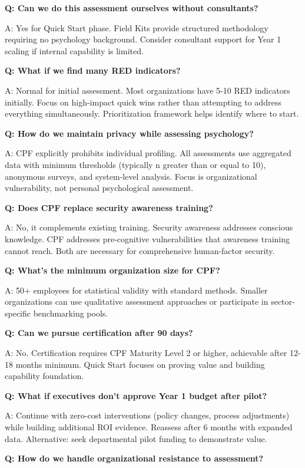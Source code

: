\documentclass[11pt,a4paper]{article}
\begin{document}
\textbf{Q: Can we do this assessment ourselves without consultants?}

A: Yes for Quick Start phase. Field Kits provide structured methodology requiring no psychology background. Consider consultant support for Year 1 scaling if internal capability is limited.

\textbf{Q: What if we find many RED indicators?}

A: Normal for initial assessment. Most organizations have 5-10 RED indicators initially. Focus on high-impact quick wins rather than attempting to address everything simultaneously. Prioritization framework helps identify where to start.

\textbf{Q: How do we maintain privacy while assessing psychology?}

A: CPF explicitly prohibits individual profiling. All assessments use aggregated data with minimum thresholds (typically n greater than or equal to 10), anonymous surveys, and system-level analysis. Focus is organizational vulnerability, not personal psychological assessment.

\textbf{Q: Does CPF replace security awareness training?}

A: No, it complements existing training. Security awareness addresses conscious knowledge. CPF addresses pre-cognitive vulnerabilities that awareness training cannot reach. Both are necessary for comprehensive human-factor security.

\textbf{Q: What's the minimum organization size for CPF?}

A: 50+ employees for statistical validity with standard methods. Smaller organizations can use qualitative assessment approaches or participate in sector-specific benchmarking pools.

\textbf{Q: Can we pursue certification after 90 days?}

A: No. Certification requires CPF Maturity Level 2 or higher, achievable after 12-18 months minimum. Quick Start focuses on proving value and building capability foundation.

\textbf{Q: What if executives don't approve Year 1 budget after pilot?}

A: Continue with zero-cost interventions (policy changes, process adjustments) while building additional ROI evidence. Reassess after 6 months with expanded data. Alternative: seek departmental pilot funding to demonstrate value.

\textbf{Q: How do we handle organizational resistance to assessment?}
\end{document}
